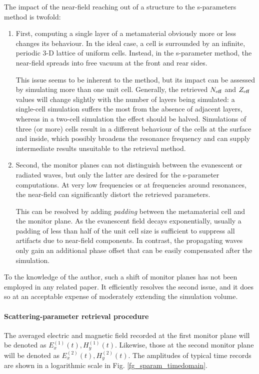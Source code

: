 The impact of the near-field reaching out of a structure to the s-parameters method is twofold:
\begin{enumerate}
 \item{First, computing a single layer of a metamaterial obviously more or less changes its behaviour. In the ideal case, a cell is surrounded by an infinite, periodic 3-D lattice of uniform cells.  Instead, in the s-parameter method, %
the near-field spreads into free vacuum at the front and rear sides. 

This issue seems to be inherent to the method, but its impact can be assessed by simulating more than one unit cell. Generally, the retrieved $N_{\text{eff} }$ and $Z_{\text{eff} }$ values will change slightly with the number of layers being simulated: a single-cell simulation suffers the most from the absence of adjacent layers, whereas in a two-cell simulation the effect should be halved. Simulations of three (or more) cells result in a different behaviour of the cells at the surface and inside, which possibly broadens the resonance frequency and can supply intermediate results unsuitable to the retrieval method.
 } 
 \item{Second, the monitor planes can not distinguish between the evanescent or radiated waves, but only the latter are desired for the s-parameter computations. At very low frequencies or at frequencies around resonances, the near-field can significantly distort the retrieved parameters.

This can be resolved by adding \textit{padding} between the metamaterial cell and the monitor plane. As the evanescent field decays exponentially, usually a padding of less than half of the unit cell size is sufficient to suppress all artifacts due to near-field components. In contrast, the propagating waves only gain an additional phase offset that can be easily compensated after the simulation. } 
 \end{enumerate}
To the knowledge of the author, such a shift of monitor planes has not been employed in any related paper. It efficiently resolves the second issue, and it does so at an acceptable expense of moderately extending the simulation volume.
\paragraph{Scattering-parameter retrieval procedure} %
The averaged electric and magnetic field recorded at the first monitor plane will be denoted as $E_{x}^{(1)}(t), H_{y}^{(1)}(t)$. Likewise, those at the second monitor plane will be denoted as $E_{x}^{(2)}(t), H_{y}^{(2)}(t)$. The amplitudes of typical time records are shown in a logarithmic scale in Fig. \ref{fg_sparam_timedomain}. 

